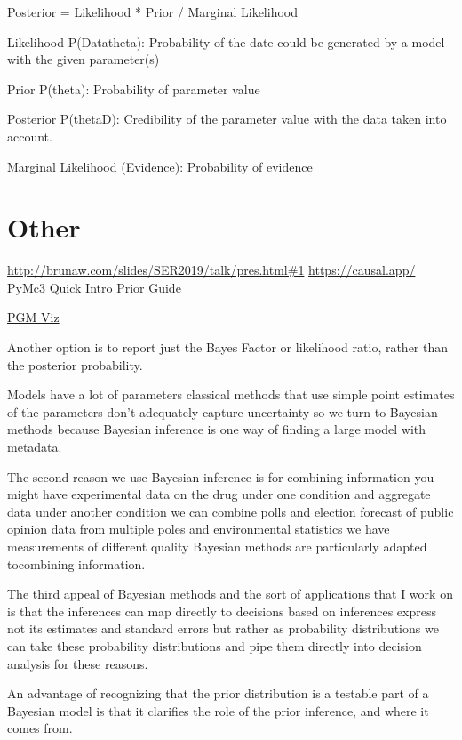 \documentclass[]{book}
\begin{document}
Posterior = Likelihood * Prior / Marginal Likelihood

Likelihood P(Data\textbar{}theta): Probability of the date could be generated by a model with the given parameter(s)

Prior P(theta): Probability of parameter value

Posterior P(theta\textbar{}D): Credibility of the parameter value with the data taken into account.

Marginal Likelihood (Evidence): Probability of evidence

\hypertarget{other-2}{%
\section{Other}\label{other-2}}

\url{http://brunaw.com/slides/SER2019/talk/pres.html\#1} \url{https://causal.app/} \href{https://docs.google.com/presentation/d/1buknIrG5b8u0twrwvlxcTudIOdx68AlqDiST_A_jJ9g/edit\#slide=id.g4254d546f6_0_0}{PyMc3 Quick Intro} \href{https://github.com/stan-dev/stan/wiki/Prior-Choice-Recommendations}{Prior Guide}

\href{http://daft-pgm.org}{PGM Viz}

Another option is to report just the Bayes Factor or likelihood ratio, rather than the posterior probability.

Models have a lot of parameters classical methods that use simple point estimates of the parameters don't adequately capture uncertainty so we turn to Bayesian methods because Bayesian inference is one way of finding a large model with metadata.

The second reason we use Bayesian inference is for combining information you might have experimental data on the drug under one condition and aggregate data under another condition we can combine polls and election forecast of public opinion data from multiple poles and environmental statistics we have measurements of different quality Bayesian methods are particularly adapted tocombining information.

The third appeal of Bayesian methods and the sort of applications that I work on is that the inferences can map directly to decisions based on inferences express not its estimates and standard errors but rather as probability distributions we can take these probability distributions and pipe them directly into decision analysis for these reasons.

An advantage of recognizing that the prior distribution is a testable part of a Bayesian model is that it clarifies the role of the prior inference, and where it comes from.
\end{document}
